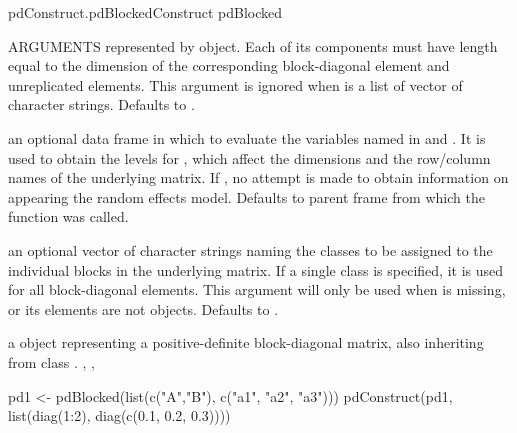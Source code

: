 \documentclass[pdftex]{article} \usepackage{url,graphicx}
\begin{document}
\begin{Helpfile}{pdConstruct.pdBlocked}{Construct pdBlocked}
\begin{Argument}{ARGUMENTS}
represented by object. Each of its components must have  
length equal to the dimension of the corresponding block-diagonal
element and unreplicated elements. This argument is ignored when 
 is a list of vector of character strings. Defaults to 
.
\item[\Co{data:}]
an optional data frame in which to evaluate the variables
named in  and . It is used to
obtain the levels for , which affect the
dimensions and the row/column names of the underlying matrix. If
, no attempt is made to obtain information on 
 appearing the random effects model. Defaults to parent
frame from which the function was called.
\item[\Co{pdClass:}]
an optional vector of character strings naming the
 classes to be assigned to the individual blocks in the
underlying matrix. If a single class is specified, it is used for all
block-diagonal elements. This argument will only be used when
 is missing, or its elements are not 
objects. Defaults to .
\end{Argument}
a  object representing a positive-definite
block-diagonal matrix, also inheriting from class .
, ,
\need 15pt
\vspace{-16pt} 
\begin{Example}
pd1 <- pdBlocked(list(c("A","B"), c("a1", "a2", "a3")))
pdConstruct(pd1, list(diag(1:2), diag(c(0.1, 0.2, 0.3))))
\end{Example}
\end{Helpfile}
\end{document}
